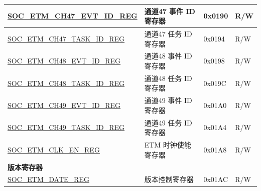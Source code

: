 \begin{longtable}{ | p{6cm} | p{6.2cm} | p{1.3cm} | p{2cm} | }
\hyperref[regdesc:SOCETMCH0EVTIDREG]{SOC\_ETM\_CH47\_EVT\_ID\_REG} & 通道47 事件 ID 寄存器 & 0x0190 & R/W \\ \hline
\hyperref[regdesc:SOCETMCH0TASKIDREG]{SOC\_ETM\_CH47\_TASK\_ID\_REG} & 通道47 任务 ID 寄存器 & 0x0194 & R/W \\ \hline
\hyperref[regdesc:SOCETMCH0EVTIDREG]{SOC\_ETM\_CH48\_EVT\_ID\_REG} & 通道48 事件 ID 寄存器 & 0x0198 & R/W \\ \hline
\hyperref[regdesc:SOCETMCH0TASKIDREG]{SOC\_ETM\_CH48\_TASK\_ID\_REG} & 通道48 任务 ID 寄存器 & 0x019C & R/W \\ \hline
\hyperref[regdesc:SOCETMCH0EVTIDREG]{SOC\_ETM\_CH49\_EVT\_ID\_REG} & 通道49 事件 ID 寄存器 & 0x01A0 & R/W \\ \hline
\hyperref[regdesc:SOCETMCH0TASKIDREG]{SOC\_ETM\_CH49\_TASK\_ID\_REG} & 通道49 任务 ID 寄存器 & 0x01A4 & R/W \\ \hline
\hyperref[regdesc:SOCETMCLKENREG]{SOC\_ETM\_CLK\_EN\_REG} & ETM 时钟使能寄存器 & 0x01A8 & R/W \\ \hline
\multicolumn{4}{|l|}{\textbf{版本寄存器}} \\ \hline
\hyperref[regdesc:SOCETMDATEREG]{SOC\_ETM\_DATE\_REG} & 版本控制寄存器 & 0x01AC & R/W \\ \hline
\end{longtable}
